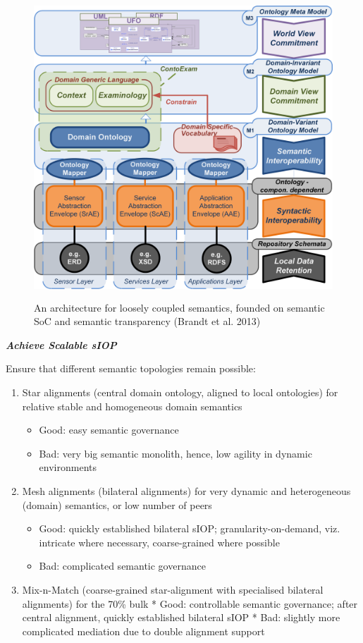 \documentclass[a4paper,11pt,oneside,oldfontcommands]{memoir}
\theoremstyle{definition}
\theoremstyle{break}		%
\numberwithin{equation}{chapter}
\numberwithin{figure}{chapter}
\begin{document}
\begin{figure}
\hypertarget{fig:sSoC}{%
\centering
\includegraphics[width=4.66667in,height=4.4375in]{src/images/SemanticSoC.png}
\caption{An architecture for loosely coupled semantics, founded on
semantic SoC and semantic transparency (Brandt et al.
2013)}\label{fig:sSoC}
}
\end{figure}

\textbf{\emph{Achieve Scalable sIOP}}

Ensure that different semantic topologies remain possible:

\begin{enumerate}
\def\labelenumi{\roman{enumi}.}
\tightlist
\item
  Star alignments (central domain ontology, aligned to local ontologies)
  for relative stable and homogeneous domain semantics

  \begin{itemize}
  \tightlist
  \item
    Good: easy semantic governance
  \item
    Bad: very big semantic monolith, hence, low agility in dynamic
    environments
  \end{itemize}
\item
  Mesh alignments (bilateral alignments) for very dynamic and
  heterogeneous (domain) semantics, or low number of peers

  \begin{itemize}
  \tightlist
  \item
    Good: quickly established bilateral sIOP; granularity-on-demand,
    viz. intricate where necessary, coarse-grained where possible
  \item
    Bad: complicated semantic governance
  \end{itemize}
\item
  Mix-n-Match (coarse-grained star-alignment with specialised bilateral
  alignments) for the 70\% bulk * Good: controllable semantic
  governance; after central alignment, quickly established bilateral
  sIOP * Bad: slightly more complicated mediation due to double
  alignment support
\end{enumerate}
\end{document}
